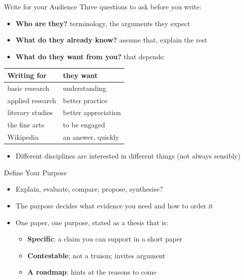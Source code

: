 \documentclass[aspectratio=169]{beamer}
\begin{document}
\begin{frame}{Write for your Audience}
Three questions to ask before you write:
\begin{itemize}
\item \textbf{Who are they?} \hfill terminology, the arguments they expect
\item \textbf{What do they already know?} \hfill assume that, explain the rest
\item \textbf{What do they want from you?} \hfill that depends:
\end{itemize}

\begin{center}
\begin{tabular}{@{}ll@{}}
\toprule
\textbf{Writing for} & \textbf{they want} \\
\midrule
basic research    & understanding \\
applied research  & better practice \\
literary studies  & better appreciation \\
the fine arts     & to be engaged \\
Wikipedia         & an answer, quickly \\
\bottomrule
\end{tabular}
\end{center}

\begin{itemize}
\item Different disciplines are interested in different things (not always sensibly)
\end{itemize}
\end{frame}

\begin{frame}{Define Your Purpose}
\begin{itemize}
  \item Explain, evaluate, compare, propose, synthesise?
  \item The purpose decides what evidence you need and how to order it
  \item One paper, one purpose, stated as a thesis that is:
    \begin{itemize}
    \item \textbf{Specific}: a claim you can support in a short paper
    \item \textbf{Contestable}: not a truism; invites argument
    \item \textbf{A roadmap}: hints at the reasons to come
    \end{itemize}
  \end{itemize}
\end{frame}
\end{document}
